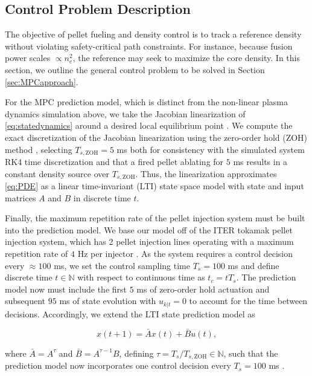 \documentclass[journal,twoside,web]{ieeecolor}
\begin{document}
\subsection{Control Problem Description}
\label{subsec:ControlProblem}

The objective of pellet fueling and density control is to track a reference density without violating safety-critical path constraints. For instance, because fusion power scales $\propto n_e^2$, the reference may seek to maximize the core density. In this section, we outline the general control problem to be solved in Section \ref{sec:MPCapproach}.

For the MPC prediction model, which is distinct from the non-linear plasma dynamics simulation above, we take the Jacobian linearization of \eqref{eq:statedynamics} around a desired local equilibrium point \cite{Franklin1997, Rawlings2017}. We compute the exact discretization of the Jacobian linearization using the zero-order hold (ZOH) method \cite{Franklin1997}, selecting $T_{s,\textrm{ZOH}} = 5$ ms both for consistency with the simulated system RK4 time discretization and that a fired pellet ablating for $5$ ms results in a constant density source over $T_{s,\textrm{ZOH}}$. Thus, the linearization approximates \eqref{eq:PDE} as a linear time-invariant (LTI) state space model with state and input matrices $A$ and $B$ in discrete time $t$.

Finally, the maximum repetition rate of the pellet injection system must be built into the prediction model. We base our model off of the ITER tokamak pellet injection system, which has 2 pellet injection lines operating with a maximum repetition rate of $4$ Hz per injector \cite{Baylor2016}. As the system requires a control decision every $\approx 100$ ms, we set the control sampling time $T_s = 100$ ms and define discrete time $t \in \mathbb{N}$ with respect to continuous time as $t_c = tT_s$. The prediction model now must include the first $5$ ms of zero-order hold actuation and subsequent $95$ ms of state evolution with $u_{k|t} = 0$ to account for the time between decisions. Accordingly, we extend the LTI state prediction model as

\begin{equation}
    x(t+1) = \bar{A}x(t)+\bar{B}u(t), \label{eq:ZOHfix}
\end{equation}

\noindent where $\bar{A} = A^{\tau}$ and $\bar{B} = A^{\tau-1}B$, defining $\tau = T_s/T_{s,\textrm{ZOH}} \in \mathbb{N}$, such that the prediction model now incorporates one control decision every $T_s = 100$ ms \cite{Rawlings2017}. 
\end{document}
